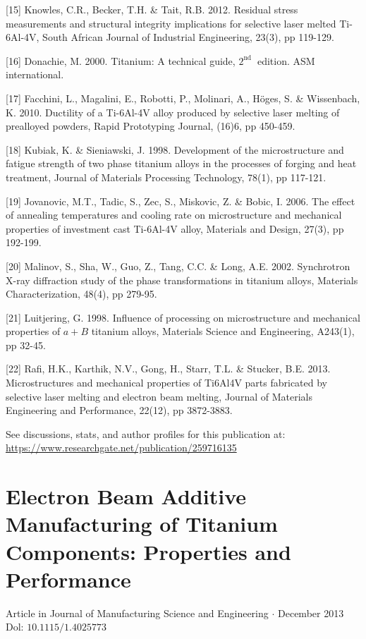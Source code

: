 \documentclass[10pt]{article}
\begin{document}
[15] Knowles, C.R., Becker, T.H. \& Tait, R.B. 2012. Residual stress measurements and structural integrity implications for selective laser melted Ti-6Al-4V, South African Journal of Industrial Engineering, 23(3), pp 119-129.

[16] Donachie, M. 2000. Titanium: A technical guide, $2^{\text {nd }}$ edition. ASM international.

[17] Facchini, L., Magalini, E., Robotti, P., Molinari, A., Höges, S. \& Wissenbach, K. 2010. Ductility of a Ti-6Al-4V alloy produced by selective laser melting of prealloyed powders, Rapid Prototyping Journal, (16)6, pp 450-459.

[18] Kubiak, K. \& Sieniawski, J. 1998. Development of the microstructure and fatigue strength of two phase titanium alloys in the processes of forging and heat treatment, Journal of Materials Processing Technology, 78(1), pp 117-121.

[19] Jovanovic, M.T., Tadic, S., Zec, S., Miskovic, Z. \& Bobic, I. 2006. The effect of annealing temperatures and cooling rate on microstructure and mechanical properties of investment cast Ti-6Al-4V alloy, Materials and Design, 27(3), pp 192-199.

[20] Malinov, S., Sha, W., Guo, Z., Tang, C.C. \& Long, A.E. 2002. Synchrotron X-ray diffraction study of the phase transformations in titanium alloys, Materials Characterization, 48(4), pp 279-95.

[21] Luitjering, G. 1998. Influence of processing on microstructure and mechanical properties of $a+B$ titanium alloys, Materials Science and Engineering, A243(1), pp 32-45.

[22] Rafi, H.K., Karthik, N.V., Gong, H., Starr, T.L. \& Stucker, B.E. 2013. Microstructures and mechanical properties of Ti6Al4V parts fabricated by selective laser melting and electron beam melting, Journal of Materials Engineering and Performance, 22(12), pp 3872-3883.

See discussions, stats, and author profiles for this publication at: \href{https://www.researchgate.net/publication/259716135}{https://www.researchgate.net/publication/259716135}

\section*{Electron Beam Additive Manufacturing of Titanium Components: Properties and Performance}
Article in Journal of Manufacturing Science and Engineering $\cdot$ December 2013 Dol: $10.1115 / 1.4025773$
\end{document}
